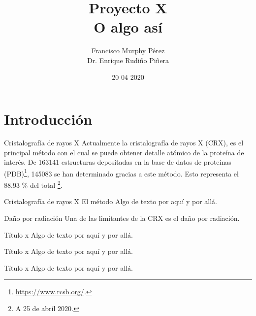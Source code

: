 \documentclass{beamer}
\title{Proyecto X \\ O algo así}
\author{Francisco Murphy Pérez \\ Dr. Enrique Rudiño Piñera}
\institute{Instituto de Biotecnología \\ Universidad Nacional Autónoma de México}
\date{20 04 2020}
\begin{document}

\begin{frame}
	\maketitle %
\end{frame}


\section{Introducción}

\begin{frame}{Cristalografía de rayos X}
Actualmente la cristalografía de rayos X (CRX), es el principal método con el cual se puede obtener detalle atómico de la proteína de interés. De 163141 estructuras depositadas en la base de datos de proteínas (PDB)\footnote{\url{https://www.rcsb.org/}.}, 145083 se han determinado gracias a este método. Esto representa el 88.93 \% del total \footnote{A 25 de abril 2020.}.
\end{frame}

\begin{frame}{Cristalografía de rayos X}
El método 	
	Algo de texto por aquí y por allá.
\end{frame}

\begin{frame}{Daño por radiación}
	Una de las limitantes de la CRX es el daño por radiación.
\end{frame}

\begin{frame}{Título x}
	Algo de texto por aquí y por allá.
\end{frame}

\begin{frame}{Título x}
	Algo de texto por aquí y por allá.
\end{frame}

\begin{frame}{Título x}
	Algo de texto por aquí y por allá.
\end{frame}

\end{document}
